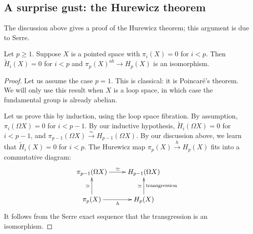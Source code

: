 \subsection*{A surprise gust: the Hurewicz theorem}
The discussion above gives a proof of the Hurewicz theorem; this argument is
due to Serre.
\begin{theorem}
    Let $p\geq 1$. Suppose $X$ is a pointed space with $\pi_i(X) = 0$ for
    $i<p$. Then $\widetilde{H}_i(X) = 0$ for $i<p$ and $\pi_p(X)^{ab}\to
    H_p(X)$ is an isomorphism.
\end{theorem}
\begin{proof}
    Let us assume the case $p=1$. This is classical: it is Poincar\'{e}'s
    theorem. We will only use this result when $X$ is a loop space, in which
    case the fundamental group is already abelian.

    Let us prove this by induction, using the loop space fibration. By
    assumption, $\pi_i(\Omega X) = 0$ for $i<p-1$. By our inductive hypothesis,
    $\widetilde{H}_i(\Omega X) = 0$ for $i<p-1$, and $\pi_{p-1}(\Omega X)
    \xrightarrow{\simeq} H_{p-1}(\Omega X)$. By our discussion above, we learn
    that $\widetilde{H}_i(X) = 0$ for $i<p$. The Hurewicz map
    $\pi_p(X)\xrightarrow{h}H_p(X)$ fits into a commutative diagram:
    \begin{equation*}
	\xymatrix{
	    \pi_{p-1}(\Omega X)\ar[r]^\simeq & H_{p-1}(\Omega X)\\
	    \pi_p(X)\ar[u]^\simeq \ar[r]_h &
	    H_p(X)\ar[u]^{\simeq}_{\text{transgression}}
	    }
    \end{equation*}
    It follows from the Serre exact sequence that the transgression is an
    isomorphism.
\end{proof}
